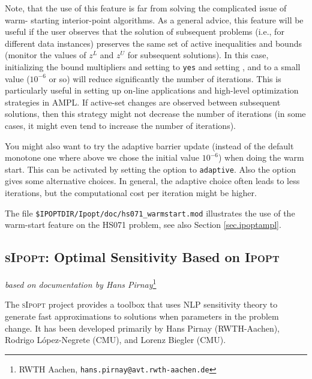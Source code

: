 \documentclass[10pt]{article}
\newcommand{\Ipopt}{\textsc{Ipopt}\xspace}
\newcommand{\sIpopt}{\textsc{sIpopt}\xspace}
\begin{document}
Note, that the use of this feature is far from solving the complicated issue of warm-
starting interior-point algorithms. As a general advice, this feature will be useful if the 
user observes that the solution of subsequent problems (i.e., for different data instances) 
preserves the same set of active inequalities and bounds (monitor the values of $z^L$ and 
$z^U$ for subsequent solutions). In this case, initializing the bound multipliers and 
setting  to {\tt yes} and 
setting ,
 and
 to a small value ($10^{-6}$ or so) will reduce 
significantly the number of iterations. This is particularly useful in setting up on-line 
applications and high-level optimization strategies in AMPL.
If active-set changes are observed between subsequent solutions, then this strategy might 
not decrease the number of iterations (in some cases, it might even tend to increase the 
number of iterations).

You might also want to try the adaptive barrier update (instead of the default monotone one where above we chose the initial value $10^{-6}$) when doing the warm start. This can be activated by setting the  option to {\tt adaptive}. Also the option  gives some alternative choices. In general, the adaptive choice often leads to less iterations, but the computational cost per iteration might be higher.

The file {\tt \$IPOPTDIR/Ipopt/doc/hs071\_warmstart.mod} illustrates the use of the warm-start feature on the HS071 problem, see also Section \ref{sec.ipoptampl}.

\subsection{\sIpopt: Optimal Sensitivity Based on \Ipopt}
\hfill \textit{based on documentation by Hans Pirnay}\footnote{RWTH Aachen, {\tt hans.pirnay@avt.rwth-aachen.de}}
\medskip

The \sIpopt project provides a toolbox that uses NLP sensitivity theory to generate fast approximations to solutions when parameters in the problem change. It has been developed primarily by Hans Pirnay (RWTH-Aachen), Rodrigo L\'opez-Negrete (CMU), and Lorenz Biegler (CMU).
\end{document}
